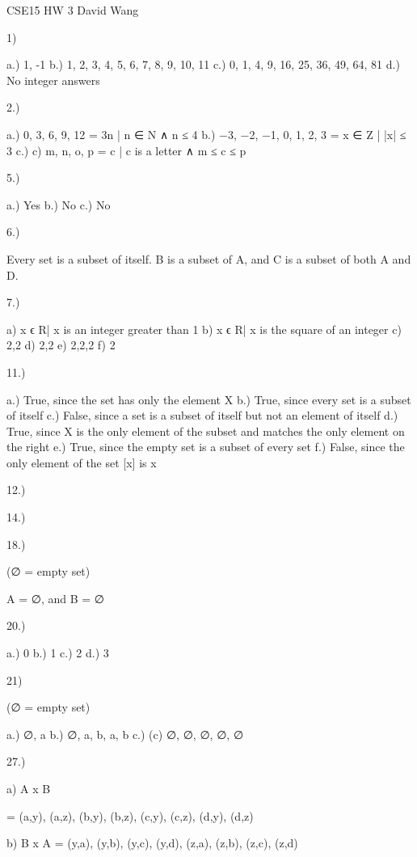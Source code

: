 CSE15 HW 3
David Wang

1)

	a.) {1, -1}
	b.) {1, 2, 3, 4, 5, 6, 7, 8, 9, 10, 11}
	c.) {0, 1, 4, 9, 16, 25, 36, 49, 64, 81}
	d.) No integer answers

2.) 

	a.) {0, 3, 6, 9, 12} = {3n | n ∈ N ∧ n ≤ 4}
	b.) {−3, −2, −1, 0, 1, 2, 3} = {x ∈ Z | |x| ≤ 3}
	c.) c) {m, n, o, p} = {c | c is a letter ∧ m ≤ c ≤ p}

5.) 

	a.) Yes
	b.) No
	c.) No

6.)

	 Every set is a subset of itself. B is a subset of A, and C is a subset of both A and D.


7.) 

	a) 	{x ϵ R| x is an integer greater than 1}
	b)	 {x ϵ R| x is the square of an integer}
	c) 	{2,{2}}
	d) 	{{2},{{2}}}
	e) 	{{2},{2,{2}}}
	f) 	{{{2}}}


11.) 

	a.) True, since the set has only the element X
	b.) True, since every set is a subset of itself
	c.)  False, since a set is a subset of itself but not an element of itself
	d.) True, since X is the only element of the subset and matches the only element on the right
	e.) True, since the empty set is a subset of every set
	f.) False, since the only element of the set [x] is x

12.)



14.)

18.) 

	(∅ = empty set)

	A = ∅, and B = ∅ 

20.)

	a.) 0 
	b.) 1
	c.) 2
	d.) 3

21)

(∅ = empty set)

	a.) {∅, {a}}
	b.)  {∅, {a}, {b}, {a, b}}
	c.) (c) {∅, {∅}, {{∅}}, {∅, {∅}}}

27.) 

	a)
 	A x B

 	= {(a,y), (a,z), (b,y), (b,z), (c,y), (c,z), (d,y), (d,z)} 

	b)
 	B x A
 	= {(y,a), (y,b), (y,c), (y,d), (z,a), (z,b), (z,c), (z,d)} 